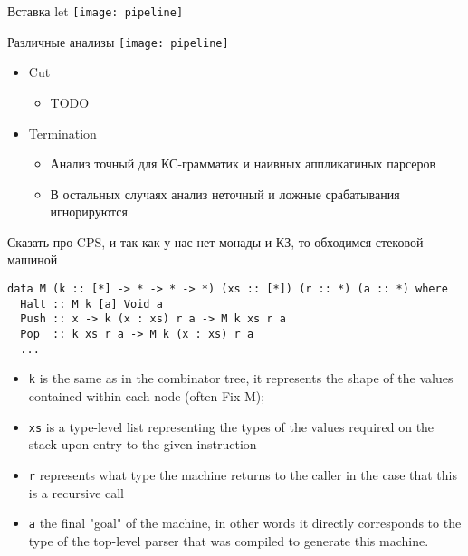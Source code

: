 \documentclass[aspectratio=169
  , xcolor={svgnames}
  , hyperref={ colorlinks,citecolor=Blue
             , linkcolor=DarkRed,urlcolor=DarkBlue}
  , russian
  ]{beamer}
\begin{document}

\begin{frame}{Вставка let}
\texttt{[image: pipeline]}


\haskellLetZero
\haskellLetOne
\end{frame}


\begin{frame}{Различные анализы}
\texttt{[image: pipeline]}
\begin{itemize}
\item Cut 
\begin{itemize}
\item TODO
\end{itemize}
\item Termination
\begin{itemize}
\item Анализ точный для КС-грамматик и наивных аппликатиных парсеров
\item В остальных случаях анализ неточный и ложные срабатывания игнорируются
\end{itemize}
\end{itemize}
\end{frame}




\begin{frame}[fragile]{}
Сказать про CPS, и так как у нас нет монады и КЗ, то обходимся стековой машиной

\begin{verbatim}
data M (k :: [*] -> * -> * -> *) (xs :: [*]) (r :: *) (a :: *) where
  Halt :: M k [a] Void a
  Push :: x -> k (x : xs) r a -> M k xs r a
  Pop  :: k xs r a -> M k (x : xs) r a
  ...
\end{verbatim}

\begin{itemize}
\item \texttt{k} is the same as in the combinator tree, it represents the shape of
the values contained within each node (often Fix M); 
\item \texttt{xs} is a type-level list representing the types of
the values required on the stack upon entry to the given instruction
\item \texttt{r} represents what type the
machine returns to the caller in the case that this is a recursive call
\item \texttt{a} the final "goal" of
the machine, in other words it directly corresponds to the type of the top-level parser that was
compiled to generate this machine.
\end{itemize}
\end{frame}
\end{document}
